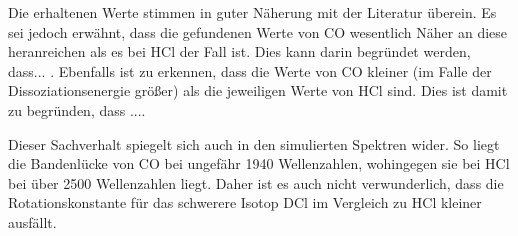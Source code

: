 Die erhaltenen Werte stimmen in guter Näherung mit der Literatur überein. Es sei jedoch erwähnt, dass die gefundenen Werte von CO wesentlich Näher an diese heranreichen als es bei HCl der Fall ist. Dies kann darin begründet werden, dass... . Ebenfalls ist zu erkennen, dass  die Werte von CO kleiner (im Falle der Dissoziationsenergie größer) als die jeweiligen Werte von HCl sind. Dies ist damit zu begründen, dass  ....
 
Dieser Sachverhalt spiegelt sich auch in den simulierten Spektren wider. So liegt die Bandenlücke von CO bei ungefähr 1940 Wellenzahlen, wohingegen sie bei HCl bei über 2500 Wellenzahlen liegt. Daher ist es auch nicht verwunderlich, dass die Rotationskonstante für das schwerere Isotop DCl im Vergleich zu HCl kleiner ausfällt.

%
